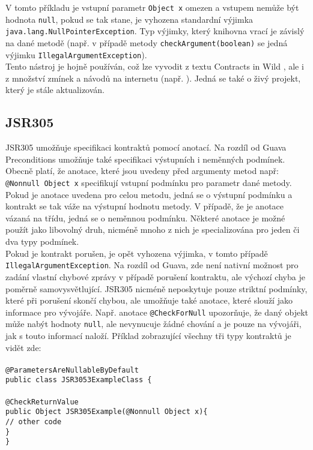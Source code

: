     		V tomto příkladu je vstupní parametr \texttt{Object x} omezen a vstupem nemůže být hodnota \texttt{null}, pokud se tak stane, je vyhozena standardní výjimka \texttt{java.lang.NullPointerException}. Typ výjimky, který knihovna vrací je závislý na dané metodě (např. v případě metody \texttt{checkArgument(boolean)} se jedná výjimku \texttt{IllegalArgumentException}).\\
    		
    		Tento nástroj je hojně používán, což lze vyvodit z textu Contracts in Wild \cite{contractsInWild}, ale i z množství zmínek a návodů na internetu (např. \cite{guavaTutorial}). Jedná se také o živý projekt, který je stále aktualizován.
		
		
		\subsection{JSR305}
			JSR305 \cite{jsr305} umožňuje specifikaci kontraktů pomocí anotací. Na rozdíl od Guava Preconditions umožňuje také specifikaci výstupních i neměnných podmínek. Obecně platí, že anotace, které jsou uvedeny před argumenty metod např: \texttt{@Nonnull Object x} specifikují vstupní podmínku pro parametr dané metody. Pokud je anotace uvedena pro celou metodu, jedná se o výstupní podmínku a kontrakt se tak váže na výstupní hodnotu metody. V případě, že je anotace vázaná na třídu, jedná se o neměnnou podmínku. Některé anotace je možné použít jako libovolný druh, nicméně mnoho z nich je specializována pro jeden či dva typy podmínek.\\ 
			
			Pokud je kontrakt porušen, je opět vyhozena výjimka, v tomto případě \texttt{IllegalArgumentException}. Na rozdíl od Guava, zde není nativní možnost pro zadání vlastní chybové zprávy v případě porušení kontraktu, ale výchozí chyba je poměrně samovysvětlující. JSR305 nicméně neposkytuje pouze striktní podmínky, které při porušení skončí chybou, ale umožňuje také anotace, které slouží jako informace pro vývojáře. Např. anotace \texttt{@CheckForNull} upozorňuje, že daný objekt může nabýt hodnoty \texttt{null}, ale nevynucuje žádné chování a je pouze na vývojáři, jak s touto informací naloží. Příklad zobrazující všechny tři typy kontraktů je vidět zde:\\\\			
			\- \- \- \- \- \texttt{@ParametersAreNullableByDefault}\\
			\- \- \- \- \- \texttt{public class JSR3053ExampleClass \{}\\\\
   			\- \- \- \- \- \- \- \- \- \- \texttt{@CheckReturnValue}\\
    		\- \- \- \- \- \- \- \- \- \- \texttt{public Object JSR305Example(@Nonnull Object x)\{}\\
      		\- \- \- \- \- \- \- \- \- \- \- \- \- \- \- \texttt{\textcolor{pgrey}{// other code}}\\
    		\- \- \- \- \- \- \- \- \- \- \texttt{\}}\\
			\- \- \- \- \- \texttt{\}}\\
			
